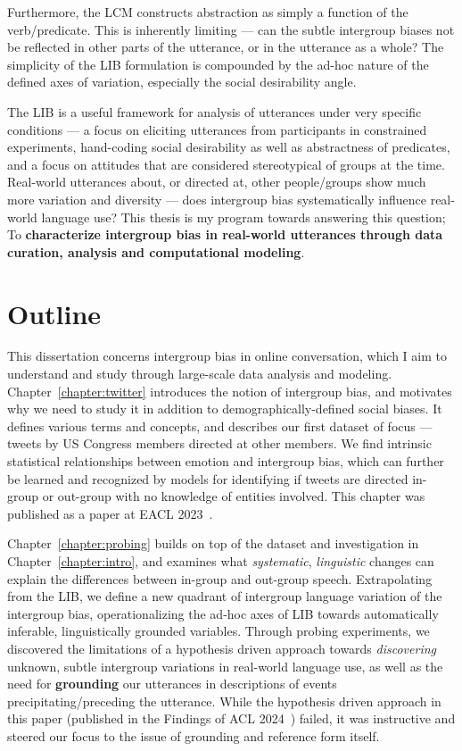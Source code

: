 Furthermore, the LCM constructs abstraction as simply a function of the verb/predicate. This is inherently limiting --- can the subtle intergroup biases not be reflected in other parts of the utterance, or in the utterance as a whole? The simplicity of the LIB formulation is compounded by the ad-hoc nature of the defined axes of variation, especially the social desirability angle. 

The LIB is a useful framework for analysis of utterances under very specific conditions --- a focus on eliciting utterances from participants in constrained experiments, hand-coding social desirability as well as abstractness of predicates, and a focus on attitudes that are considered stereotypical of groups at the time. Real-world utterances about, or directed at, other people/groups show much more variation and diversity --- does intergroup bias systematically influence real-world language use? This thesis is my program towards answering this question; To \textbf{characterize intergroup bias in real-world utterances through data curation, analysis and computational modeling}.

\section{Outline}

This dissertation concerns intergroup bias in online conversation, which I aim to understand and study through large-scale data analysis and modeling. Chapter~\ref{chapter:twitter} introduces the notion of intergroup bias, and motivates why we need to study it in addition to demographically-defined social biases. It defines various terms and concepts, and describes our first dataset of focus --- tweets by US Congress members directed at other members. We find intrinsic statistical relationships between emotion and intergroup bias, which can further be learned and recognized by models for identifying if tweets are directed in-group or out-group with no knowledge of entities involved. This chapter was published as a paper at EACL 2023~\citep{govindarajan-etal-2023-people}. 

Chapter~\ref{chapter:probing} builds on top of the dataset and investigation in Chapter~\ref{chapter:intro}, and examines what \emph{systematic}, \emph{linguistic} changes can explain the differences between in-group and out-group speech. Extrapolating from the LIB, we define a new quadrant of intergroup language variation of the intergroup bias, operationalizing the ad-hoc axes of LIB towards automatically inferable, linguistically grounded variables. Through probing experiments, we discovered the limitations of a hypothesis driven approach towards \emph{discovering} unknown, subtle intergroup variations in real-world language use, as well as the need for \textbf{grounding} our utterances in descriptions of events precipitating/preceding the utterance. While the hypothesis driven approach in this paper (published in the Findings of ACL 2024~\citep{govindarajan-etal-2023-counterfactual}) failed, it was instructive and steered our focus to the issue of grounding and reference form itself.


